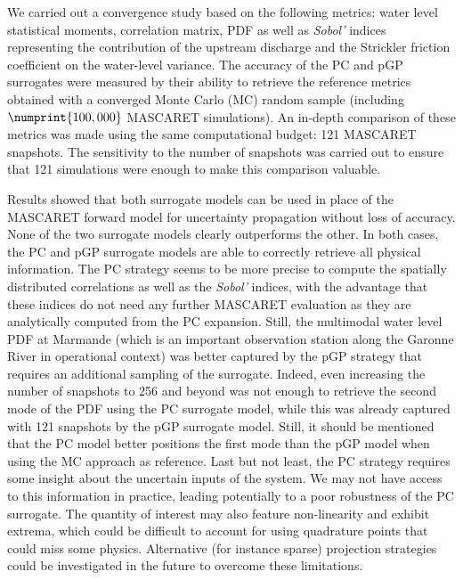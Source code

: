 We carried out a convergence study based on the following metrics: water level statistical moments, correlation matrix, PDF as well as \emph{Sobol'} indices representing the contribution of the upstream discharge and the Strickler friction coefficient on the water-level variance. The accuracy of the PC and pGP surrogates were measured by their ability to retrieve the reference metrics obtained with a converged Monte Carlo (MC) random sample (including $\numprint{100,000}$ MASCARET simulations). An in-depth comparison of these metrics was made using the same computational budget: 121 MASCARET snapshots. The sensitivity to the number of snapshots was carried out to ensure that 121 simulations were enough to make this comparison valuable.

Results showed that both surrogate models can be used in place of the MASCARET forward model for uncertainty propagation without loss of accuracy. None of the two surrogate models clearly outperforms the other. In both cases, the PC and pGP surrogate models are able to correctly retrieve all physical information. The PC strategy seems to be more precise to compute the spatially distributed correlations as well as the \emph{Sobol'} indices, with the advantage that these indices do not need any further MASCARET evaluation as they are analytically computed from the PC expansion. Still, the multimodal water level PDF at Marmande (which is an important observation station along the Garonne River in operational context) was better captured by the pGP strategy that requires an additional sampling of the surrogate. Indeed, even increasing the number of snapshots to 256 and beyond was not enough to retrieve the second mode of the PDF using the PC surrogate model, while this was already captured with 121 snapshots by the pGP surrogate model. Still, it should be mentioned that the PC model better positions the first mode than the pGP model when using the MC approach as reference. Last but not least, the PC strategy requires some insight about the uncertain inputs of the system. We may not have access to this information in practice, leading potentially to a poor robustness of the PC surrogate. The quantity of interest may also feature non-linearity and exhibit extrema, which could be difficult to account for using quadrature points that could miss some physics. Alternative (for instance sparse) projection strategies could be investigated in the future to overcome these limitations. 

